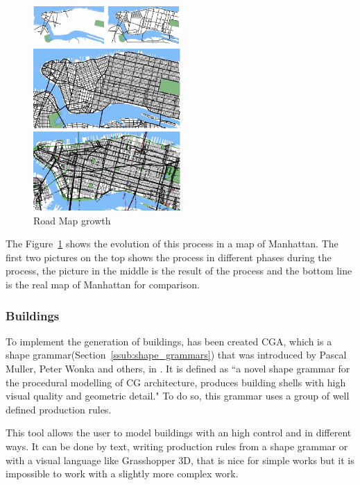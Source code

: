 \begin{figure}[htbp]
  \centering
  \includegraphics[width=0.5\textwidth]{img/Procedural-Modeling-of-Cities/Capturar.png}
  \caption{Road Map growth}
  \label{fig:city}
\end{figure}

The Figure~\ref{fig:city} shows the evolution of this process in a map of Manhattan. The first two pictures on the top shows the process in different phases during the process, the picture in the middle is the result of the process and the bottom line is the real map of Manhattan for comparison.


\subsubsection{Buildings} %
\label{ssub:buildings1}

To implement the generation of buildings, has been created CGA, which is a shape grammar(Section~\ref{ssub:shape_grammars}) that was introduced by Pascal Muller, Peter Wonka and others, in \cite{Parish2001}. It is defined as ``a novel shape grammar for the procedural modelling of CG architecture, produces building shells with high visual quality and geometric detail." To do so, this grammar uses a group of well defined production rules.

This tool allows the user to model buildings with an high control and in different ways. It can be done by text, writing production rules from a shape grammar or with a visual language like Grasshopper 3D, that is nice for simple works but it is impossible to work with a slightly more complex work. 

